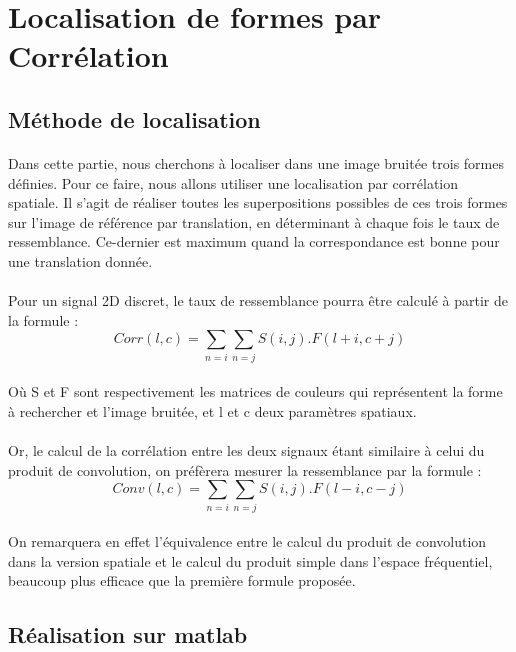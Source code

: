 \documentclass{article}
\begin{document}
\newpage
\section{Localisation de formes par Corrélation}
\subsection{Méthode de localisation}
\paragraph{}
\justifying
Dans cette partie, nous cherchons à localiser dans une image bruitée trois formes définies. Pour ce faire, nous allons utiliser une localisation par corrélation spatiale. Il s’agit de réaliser toutes les superpositions possibles de ces trois formes sur l’image de référence par translation, en déterminant à chaque fois le taux de ressemblance. Ce-dernier est maximum quand la correspondance est bonne pour une translation donnée. 
\paragraph{}
Pour un signal 2D discret, le taux de ressemblance pourra être calculé à partir de la formule : 
$$Corr(l,c) = \sum_{n=i}\sum_{n = j} S(i,j).F(l+i,c+j)$$
\paragraph{}
\justifying
Où S et F sont respectivement les matrices de couleurs qui représentent la forme à rechercher et l’image bruitée, et l et c deux paramètres spatiaux. 
\paragraph{}
Or, le calcul de la corrélation entre les deux signaux étant similaire à celui du produit de convolution, on préfèrera mesurer la ressemblance par la formule : 
$$Conv(l,c) = \sum_{n=i}\sum_{n = j} S(i,j).F(l-i,c-j)$$
\paragraph{}
\justifying
On remarquera en effet l’équivalence entre le calcul du produit de convolution dans la version spatiale et le calcul du produit simple dans l’espace fréquentiel, beaucoup plus efficace que la première formule proposée. 
\subsection{Réalisation sur matlab}
\end{document}
